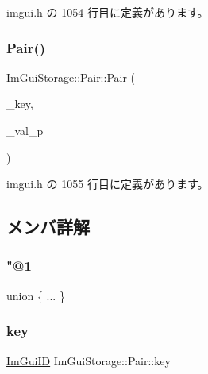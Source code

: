  imgui.\+h の 1054 行目に定義があります。

\mbox{\label{struct_im_gui_storage_1_1_pair_a4d07d60f83b4e24ee8be9ccceaab76bd}} 
\subsubsection{\texorpdfstring{Pair()}{Pair()}\hspace{0.1cm}{\footnotesize\ttfamily [3/3]}}
{\footnotesize\ttfamily Im\+Gui\+Storage\+::\+Pair\+::\+Pair (\begin{DoxyParamCaption}\item[{\mbox{\hyperlink{imgui_8h_a1785c9b6f4e16406764a85f32582236f}{Im\+Gui\+ID}}}]{\+\_\+key,  }\item[{void $\ast$}]{\+\_\+val\+\_\+p }\end{DoxyParamCaption})\hspace{0.3cm}{\ttfamily [inline]}}



 imgui.\+h の 1055 行目に定義があります。



\subsection{メンバ詳解}
\mbox{\label{struct_im_gui_storage_1_1_pair_a59f447bb1e6c85a5fe325b914b832173}} 
\subsubsection{\texorpdfstring{"@1}{@1}}
{\footnotesize\ttfamily union \{ ... \} }

\mbox{\label{struct_im_gui_storage_1_1_pair_a5b37b692d2eacc7f4f5b6f233359e6ce}} 
\subsubsection{\texorpdfstring{key}{key}}
{\footnotesize\ttfamily \mbox{\hyperlink{imgui_8h_a1785c9b6f4e16406764a85f32582236f}{Im\+Gui\+ID}} Im\+Gui\+Storage\+::\+Pair\+::key}



